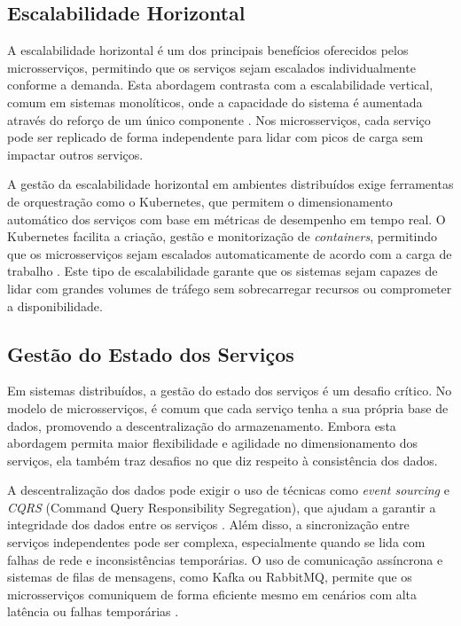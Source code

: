 \subsection{Escalabilidade Horizontal}

A escalabilidade horizontal é um dos principais benefícios oferecidos pelos microsserviços, permitindo que os serviços sejam escalados individualmente conforme a demanda. Esta abordagem contrasta com a escalabilidade vertical, comum em sistemas monolíticos, onde a capacidade do sistema é aumentada através do reforço de um único componente \cite{Blinowski2022}. Nos microsserviços, cada serviço pode ser replicado de forma independente para lidar com picos de carga sem impactar outros serviços.

A gestão da escalabilidade horizontal em ambientes distribuídos exige ferramentas de orquestração como o Kubernetes, que permitem o dimensionamento automático dos serviços com base em métricas de desempenho em tempo real. O Kubernetes facilita a criação, gestão e monitorização de \textit{containers}, permitindo que os microsserviços sejam escalados automaticamente de acordo com a carga de trabalho \cite{Rocha2023}. Este tipo de escalabilidade garante que os sistemas sejam capazes de lidar com grandes volumes de tráfego sem sobrecarregar recursos ou comprometer a disponibilidade.

\subsection{Gestão do Estado dos Serviços}

Em sistemas distribuídos, a gestão do estado dos serviços é um desafio crítico. No modelo de microsserviços, é comum que cada serviço tenha a sua própria base de dados, promovendo a descentralização do armazenamento. Embora esta abordagem permita maior flexibilidade e agilidade no dimensionamento dos serviços, ela também traz desafios no que diz respeito à consistência dos dados.

A descentralização dos dados pode exigir o uso de técnicas como \textit{event sourcing} e \textit{CQRS} (Command Query Responsibility Segregation), que ajudam a garantir a integridade dos dados entre os serviços \cite{Richardson2018}. Além disso, a sincronização entre serviços independentes pode ser complexa, especialmente quando se lida com falhas de rede e inconsistências temporárias. O uso de comunicação assíncrona e sistemas de filas de mensagens, como Kafka ou RabbitMQ, permite que os microsserviços comuniquem de forma eficiente mesmo em cenários com alta latência ou falhas temporárias \cite{Dragoni2017}.

